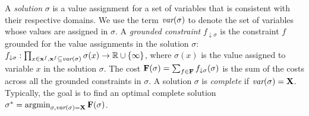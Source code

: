 \documentclass[twoside,11pt]{article}
\begin{document}
A \emph{solution} $\sigma$ is a value assignment for a set of variables that is consistent with their respective domains. We use the term ${\textit{var}(\sigma)}$ to denote the set of variables whose values are assigned in $\sigma$. 
A \emph{grounded constraint} $f_{\downarrow \sigma}$ is the constraint $f$ grounded for the value assignments in the solution $\sigma$: 
$f_{\downarrow \sigma}: \prod_{x \in {\bf{x}}^{f}, {\bf{x}}^f \subseteq {\textit{var}(\sigma)}} \sigma(x) \to \mathbb{R} \cup \{\infty\}$, where $\sigma(x)$ is the value assigned to variable $x$ in the solution $\sigma$.
The cost ${\bf{F}}(\sigma) = \sum_{f \in {\bf{F}}} f_{\downarrow \sigma}(\sigma)$ is the sum of the costs across all the grounded constraints in $\sigma$. A solution $\sigma$ is \emph{complete} if ${\textit{var}(\sigma)} = {\bf{X}}$. Typically, the goal is to find an optimal complete solution $\sigma^* = \argmin_{\sigma, \var{\sigma} = \setf{X}} \setf{F}(\sigma)$.
\end{document}
